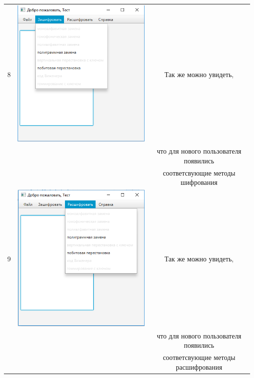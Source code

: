 \documentclass[a4paper,12pt]{article}
\begin{document}
\begin{table}[pt!]
\begin{tabular}{|c|c|c|}
	\hline 
	8 & \includegraphics[scale=0.3]{img/database/main_open_methods.png} & Так же можно увидеть, \\ && что для нового пользователя появились\\ &&  соответсвующие методы шифрования\\
	\hline 
	9 & \includegraphics[scale=0.3]{img/database/main_open_methods2.png} & Так же можно увидеть, \\ && что для нового пользователя появились\\ &&  соответсвующие методы расшифрования\\
	\hline 
\end{tabular} 
\label{table:data_type2} 
\end{table}
\end{document}
